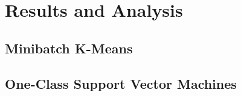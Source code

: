 \chapter{Results and Analysis}

\section{Minibatch K-Means}

\section{One-Class Support Vector Machines}